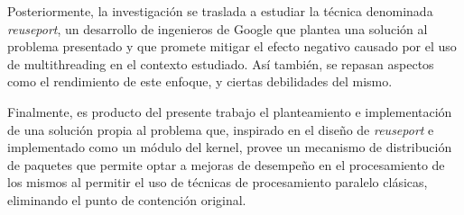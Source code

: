 Posteriormente, la investigación se traslada a estudiar la técnica denominada \emph{reuseport}, un desarrollo de ingenieros de Google que plantea una solución al problema presentado y que promete mitigar el efecto negativo causado por el uso de multithreading en el contexto estudiado. Así también, se repasan aspectos como el rendimiento de este enfoque, y ciertas debilidades del mismo. 

Finalmente, es producto del presente trabajo el planteamiento e implementación de una solución propia al problema que, inspirado en el diseño de \emph{reuseport} e implementado como un módulo del kernel, provee un mecanismo de distribución de paquetes que permite optar a mejoras de desempeño en el procesamiento de los mismos al permitir el uso de técnicas de procesamiento paralelo clásicas, eliminando el punto de contención original.
